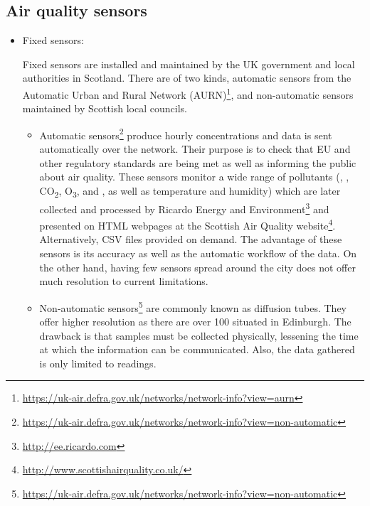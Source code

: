 \subsection{Air quality sensors}

\begin{itemize}

\item Fixed sensors: 

Fixed sensors are installed and maintained by the UK government and local authorities in Scotland. There are of two kinds, automatic sensors from the Automatic Urban and Rural Network (AURN)\footnote{\url{https://uk-air.defra.gov.uk/networks/network-info?view=aurn}}, and non-automatic sensors maintained by Scottish local councils.

	\begin{itemize}
    
    \item Automatic sensors\footnote{\url{https://uk-air.defra.gov.uk/networks/network-info?view=non-automatic}} produce hourly concentrations and data is sent automatically over the network. Their purpose is to check that EU and other regulatory standards are being met as well as informing the public about air quality. These sensors monitor a wide range of pollutants (\NOX, \SOTWO, CO\textsubscript{2}, O\textsubscript{3}, \PMTWO and \PMTEN, as well as temperature and humidity) which are later collected and processed by Ricardo Energy and Environment\footnote{\url{http://ee.ricardo.com}} and presented on HTML webpages at the Scottish Air Quality website\footnote{\url{http://www.scottishairquality.co.uk/}}. Alternatively, CSV files provided on demand. The advantage of these sensors is its accuracy as well as the automatic workflow of the data. On the other hand, having few sensors spread around the city does not offer much resolution to current limitations. 
    \item Non-automatic sensors\footnote{\url{https://uk-air.defra.gov.uk/networks/network-info?view=non-automatic}} are commonly known as diffusion tubes. They offer higher resolution as there are over 100 situated in Edinburgh. The drawback is that samples must be collected physically, lessening the time at which the information can be communicated. Also, the data gathered is only limited to \NOTWO readings.
    \end{itemize}


\end{itemize}
